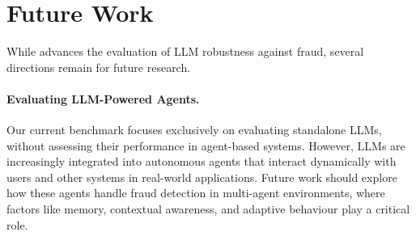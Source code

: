 \section{Future Work}
 While \ourbench advances the evaluation of LLM robustness against fraud, several directions remain for future research.

 \paragraph{Evaluating LLM-Powered Agents.} Our current benchmark focuses exclusively on evaluating standalone LLMs, without assessing their performance in agent-based systems. However, LLMs are increasingly integrated into autonomous agents that interact dynamically with users and other systems in real-world applications. Future work should explore how these agents handle fraud detection in multi-agent environments, where factors like memory, contextual awareness, and adaptive behaviour play a critical role.
\paragraph{}
 